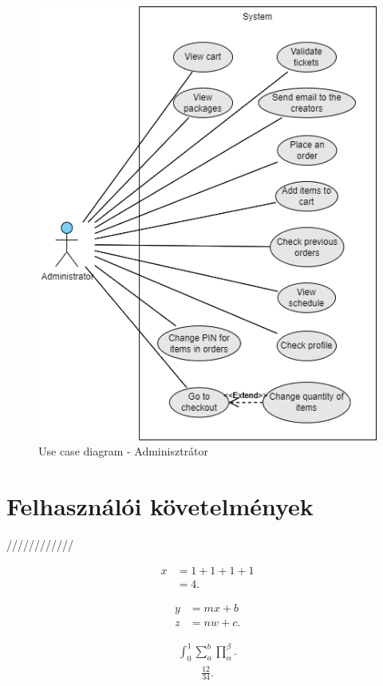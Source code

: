 \begin{figure}[!h]
	\centering
	\includegraphics[scale=0.7]{images/useCaseAdmin}
	\caption{Use case diagram - Adminisztrátor}
	\label{abra:useCaseAdmin}
\end{figure}
\pagebreak

\section {Felhasználói követelmények}

////////////


	\begin{align}
	x&=1+1+1+1\\
	&=4.
\end{align}

	\begin{align}
	y&=mx+b\nonumber\\
	z&=nw+c.
\end{align}

			\begin{align}
	\int_0^1\sum_a^b\prod_\alpha^\beta.
\end{align}
	\begin{align*}
	\frac{12}{34}.
\end{align*}
